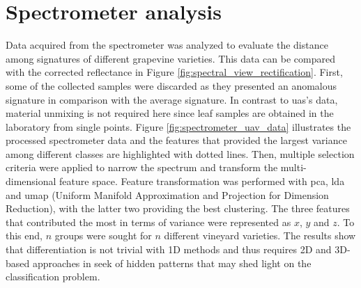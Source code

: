 \section{Spectrometer analysis}

Data acquired from the spectrometer was analyzed to evaluate the distance among signatures of different grapevine varieties. This data can be compared with the corrected reflectance in Figure \ref{fig:spectral_view_rectification}. First, some of the collected samples were discarded as they presented an anomalous signature in comparison with the average signature. In contrast to \acrshort{uas}'s data, material unmixing is not required here since leaf samples are obtained in the laboratory from single points. Figure \ref{fig:spectrometer_uav_data} illustrates the processed spectrometer data and the features that provided the largest variance among different classes are highlighted with dotted lines. Then, multiple selection criteria were applied to narrow the spectrum and transform the multi-dimensional feature space. Feature transformation was performed with \acrshort{pca}, \acrshort{lda} and \acrshort{umap} (Uniform Manifold Approximation and Projection for Dimension Reduction), with the latter two providing the best clustering. The three features that contributed the most in terms of variance were represented as $x$, $y$ and $z$. To this end, $n$ groups were sought for $n$ different vineyard varieties. The results show that differentiation is not trivial with 1D methods and thus requires 2D and 3D-based approaches in seek of hidden patterns that may shed light on the classification problem.

